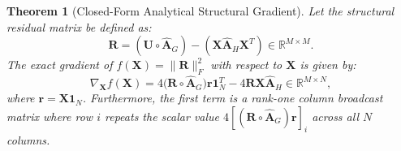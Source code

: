 \documentclass[conference]{IEEEtran}
\newtheorem{theorem}{Theorem}
\begin{document}
\begin{theorem}[Closed-Form Analytical Structural Gradient]
\label{thm:gradient}
Let the structural residual matrix be defined as:
\begin{equation}
\mathbf{R} = (\mathbf{U} \circ \hat{\mathbf{A}}_G) - (\mathbf{X}\hat{\mathbf{A}}_H\mathbf{X}^T) \in \mathbb{R}^{M \times M}.
\label{eq:residual}
\end{equation}
The exact gradient of $f(\mathbf{X}) = \|\mathbf{R}\|_F^2$ with respect to $\mathbf{X}$ is given by:
\begin{equation}
\nabla_{\mathbf{X}} f(\mathbf{X}) = 4\big(\mathbf{R} \circ \hat{\mathbf{A}}_G\big)\mathbf{r}\mathbf{1}_N^T - 4\mathbf{R}\mathbf{X}\hat{\mathbf{A}}_H \in \mathbb{R}^{M \times N},
\label{eq:thm1_result}
\end{equation}
where $\mathbf{r} = \mathbf{X}\mathbf{1}_N$. Furthermore, the first term is a rank-one column broadcast matrix where row $i$ repeats the scalar value $4[(\mathbf{R} \circ \hat{\mathbf{A}}_G)\mathbf{r}]_i$ across all $N$ columns.
\end{theorem}
\end{document}
